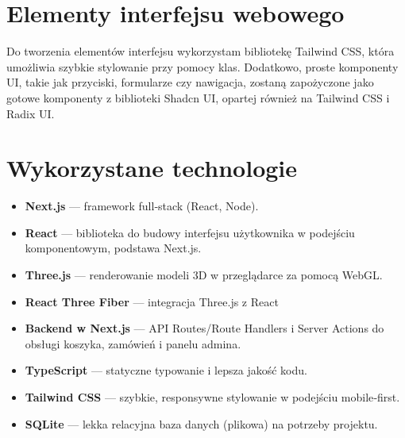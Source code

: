 \documentclass[14pt]{extarticle}
\begin{document}
	\section{Elementy interfejsu webowego}
		Do tworzenia elementów interfejsu wykorzystam bibliotekę Tailwind CSS, która umożliwia szybkie stylowanie przy pomocy klas.
		Dodatkowo, proste komponenty UI, takie jak przyciski, formularze czy nawigacja, zostaną zapożyczone jako gotowe komponenty z biblioteki Shadcn UI, opartej również na Tailwind CSS i Radix UI.
		

	\section{Wykorzystane technologie}
		\begin{itemize}
			\item \textbf{Next.js} — framework full‑stack (React, Node).
			\item \textbf{React} — biblioteka do budowy interfejsu użytkownika w podejściu komponentowym, podstawa Next.js.
			\item \textbf{Three.js} — renderowanie modeli 3D w przeglądarce za pomocą WebGL.
			\item \textbf{React Three Fiber} — integracja Three.js z React
			\item \textbf{Backend w Next.js} — API Routes/Route Handlers i Server Actions do obsługi koszyka, zamówień i panelu admina.
			\item \textbf{TypeScript} — statyczne typowanie i lepsza jakość kodu.
			\item \textbf{Tailwind CSS} — szybkie, responsywne stylowanie w podejściu mobile‑first.
			\item \textbf{SQLite} — lekka relacyjna baza danych (plikowa) na potrzeby projektu.
		\end{itemize}
		
	
\end{document}
